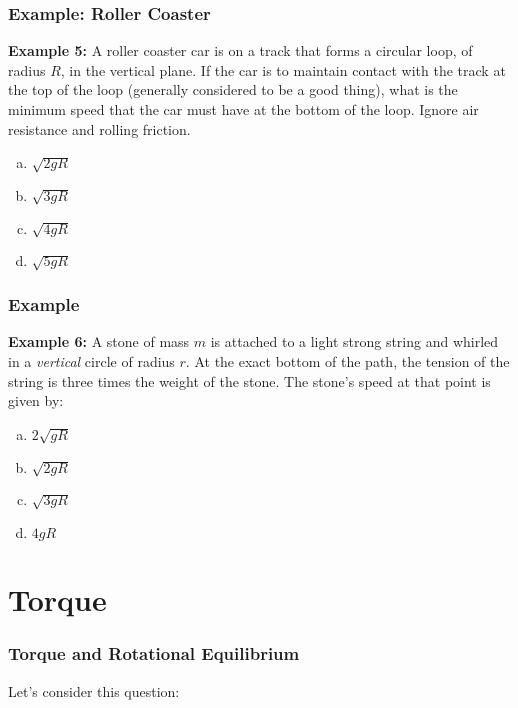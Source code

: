 \documentclass[12pt,compress,aspectratio=169]{beamer}
\begin{document}
\begin{frame}
  \frametitle{Example: Roller Coaster}
  \textbf{Example 5:} A roller coaster car is on a track that forms a circular
  loop, of radius $R$, in the vertical plane. If the car is to maintain contact
  with the track at the top of the loop (generally considered to be a good
  thing), what is the minimum speed that the car must have at the bottom of the
  loop. Ignore air resistance and rolling friction.

  \begin{enumerate}[(a)]
  \item $\sqrt{2gR}$
  \item $\sqrt{3gR}$
  \item $\sqrt{4gR}$
  \item $\sqrt{5gR}$
  \end{enumerate}
\end{frame}


\begin{frame}
  \frametitle{Example}
  \textbf{Example 6:} A stone of mass $m$ is attached to a light strong string
  and whirled in a \emph{vertical} circle of radius $r$. At the exact bottom of
  the path, the tension of the string is three times the weight of the stone.
  The stone's speed at that point is given by:
  \begin{enumerate}[(a)]
  \item $2\sqrt{gR}$
  \item $\sqrt{2gR}$
  \item $\sqrt{3gR}$
  \item $4gR$
  \end{enumerate}
\end{frame}


\section{Torque}


\begin{frame}
  \frametitle{Torque and Rotational Equilibrium}
  Let's consider this question:

  \begin{center}
  \end{center}
\end{frame}
\end{document}

